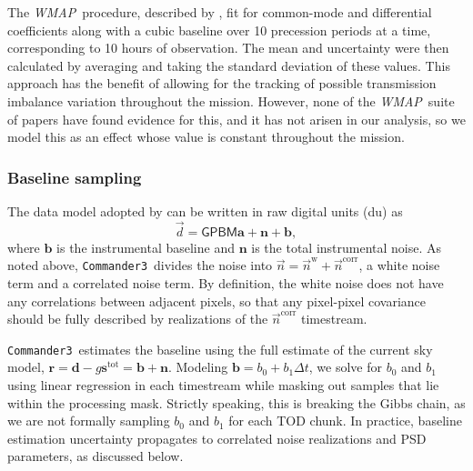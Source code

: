 \documentclass[twocolumn]{../../common/aa}
\def\WMAP{\emph{WMAP}}
\def\commanderthree{\texttt{Commander3}}
\newcommand{\n}[0]{\vec{n}}
\newcommand{\data}{\vec d}
\begin{document}
The \WMAP\ procedure, described by \citet{jarosik2003a}, fit for common-mode and differential coefficients along with a cubic baseline over 10 precession periods at a time, corresponding to 10 hours of observation. The mean and uncertainty were then calculated by averaging and taking the standard deviation of these values. This approach has the benefit of allowing for the tracking of possible transmission imbalance variation throughout the mission. However, none of the \WMAP\ suite of papers have found evidence for this, and it has not arisen in our analysis, so we model this as an effect whose value is constant throughout the mission.

\subsubsection{Baseline sampling}
\label{ssec:baseline}

The data model adopted by \citet{hinshaw2003a} can be written in raw digital units (du) as
\begin{equation}
	\data = \mathsf{GPBM}\boldsymbol a+\boldsymbol n+\boldsymbol b,
\end{equation}
where $\boldsymbol b$ is the instrumental baseline and $\boldsymbol n$ is the
total instrumental noise. As noted above, \commanderthree\ divides
the noise into $\n=\n^\mathrm w+\n^\mathrm{corr}$, a white noise term and a
correlated noise term. By definition, the white noise does not have any
correlations between adjacent pixels, so that any pixel-pixel covariance should
be fully described by realizations of the $\n^\mathrm{corr}$ timestream.

\commanderthree\ estimates the baseline using the full estimate of the current sky
model, $\boldsymbol r=\boldsymbol d-g\boldsymbol s^\mathrm{tot}=\boldsymbol
b+\boldsymbol n$. Modeling $\boldsymbol b=b_0+b_1\Delta t$, we solve for $b_0$
and $b_1$ using linear regression in each timestream while masking out samples
that lie within the processing mask. Strictly speaking, this is breaking the
Gibbs chain, as we are not formally sampling $b_0$ and $b_1$ for each TOD
chunk. In practice, baseline estimation uncertainty propagates to correlated
noise realizations and PSD parameters, as discussed below.
\end{document}
